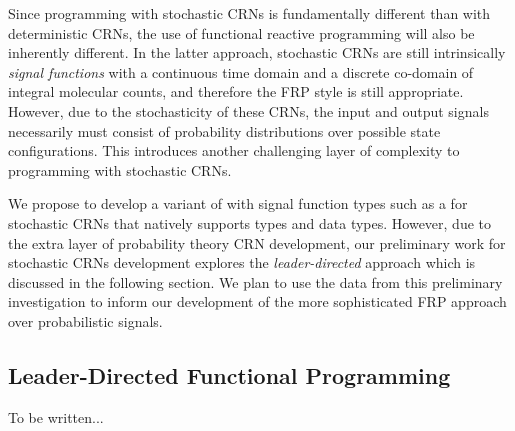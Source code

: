 Since programming with stochastic CRNs is fundamentally different than with deterministic CRNs, the use of functional reactive programming will also be inherently different.
In the latter approach, stochastic CRNs are still intrinsically \emph{signal functions} with a continuous time domain and a discrete co-domain of integral molecular counts, and therefore the FRP style is still appropriate.
However, due to the stochasticity of these CRNs, the input and output signals necessarily must consist of probability distributions over possible state configurations.
This introduces another challenging layer of complexity to programming with stochastic CRNs.

We propose to develop a variant of \reactamole{} with signal function types such as a  for stochastic CRNs that natively supports types  and  data types.
However, due to the extra layer of probability theory CRN development, our preliminary work for stochastic CRNs development explores the \emph{leader-directed} approach which is discussed in the following section.
We plan to use the data from this preliminary investigation to inform our development of the more sophisticated FRP approach over probabilistic signals.

%

\subsection{Leader-Directed Functional Programming}
\label{sub:scrn_haskell_language}

To be written...

%

